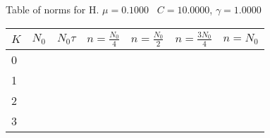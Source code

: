 \begin{center}
Table of norms for H. $\mu = 0.1000$ \, $C = 10.0000$, $\gamma = 1.0000$
  
\begin{tabular}{|p{0.8in}|p{0.8in}|p{0.8in}|p{0.8in}|p{0.8in}|p{0.8in}|p{0.8in}|} \hline
$K$ &$N_0$ &$N_0 \tau$ &$n = \frac{N_0}{4}$ &$n = \frac{N_0}{2}$ &$n = \frac{3N_0}{4}$ &$n = N_0$ \\ \hline 
0 & & & & & & \\ \hline 
1 & & & & & & \\ \hline 
2 & & & & & & \\ \hline 
3 & & & & & & \\ \hline 

\end{tabular}\\[20pt]
\end{center}
